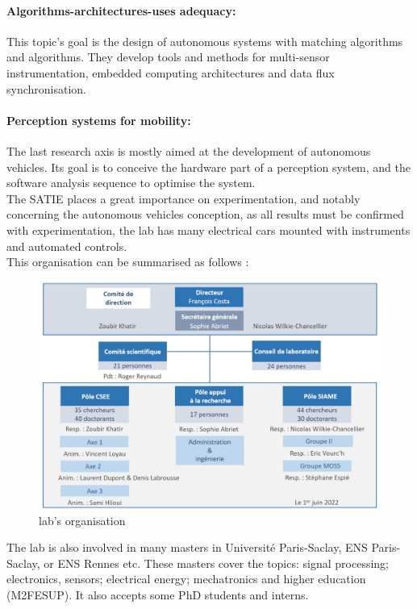 \documentclass[titlepage,11pt]{article}
\begin{document}
	\paragraph{Algorithms-architectures-uses adequacy:} This topic's goal is the design of autonomous systems with matching algorithms and algorithms. They develop tools and methods for multi-sensor instrumentation, embedded computing architectures and data flux synchronisation.
	
	\paragraph{Perception systems for mobility:} The last research axis is mostly aimed at the development of autonomous vehicles. Its goal is to conceive the hardware part of a perception system, and the software analysis sequence to optimise the system. \\
	
	The SATIE places a great importance on experimentation, and notably concerning the autonomous vehicles conception, as all results must be confirmed with experimentation, the lab has many electrical cars mounted with instruments and automated controls. \\
	
	This organisation can be summarised as follows :
	
	\begin{figure}[H]
		\centering
		\includegraphics[width=.7\linewidth]{src/satie_org}
		\caption{lab's organisation}
	\end{figure}

	The lab is also involved in many masters in Université Paris-Saclay, ENS Paris-Saclay, or ENS Rennes etc. These masters cover the topics: signal processing; electronics, sensors; electrical energy; mechatronics and higher education (M2FESUP). It also accepts some PhD students and interns.
	
\end{document}
